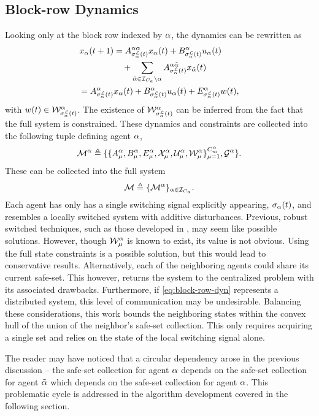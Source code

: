 \subsection{Block-row Dynamics}
Looking only at the block row indexed by $\alpha$, the dynamics can be rewritten as 
\begin{align}\label{eq:block-row-dyn}
x_\agentidx(t+1)&=A^{\agentidx\agentidx}_{\ssl[\agentidx](t)}x_\agentidx(t)+B^\agentidx_{\ssl[\agentidx](t)}u_\agentidx(t)\nonumber\\&\quad+\sum_{\tilde\agentidx\in\idxset{\numagents}\setminus \agentidx}A^{\agentidx\tilde\agentidx}_{\ssl[\agentidx](t)}x_{\tilde\agentidx}(t)\\
=A^{\agentidx}_{\ssl[\agentidx](t)}&x_\agentidx(t)+B^\agentidx_{\ssl[\agentidx](t)}u_\agentidx(t)+E_{\ssl[\agentidx](t)}^\agentidx w(t),
\end{align}
with $w(t)\in\wcon[\ssl[\agentidx](t)]^\agentidx$. The existence of $\wcon[\ssl[\agentidx](t)]^\agentidx$ can be inferred from the fact that the full system is constrained. These dynamics and constraints are collected into the following tuple defining agent $\alpha$,
$$\agent{\agentidx}\triangleq\{\{A^{\agentidx}_{\modeidx},B^\agentidx_{\modeidx}, E_{\modeidx}^\agentidx,\xcon[\modeidx]^\agentidx,\ucon[\modeidx]^\agentidx, \wcon[\modeidx]^\agentidx\}_{\modeidx=1}^{\nummodes[\agentidx]},\graph^\agentidx\}.$$
These can be collected into the full system
\begin{equation}\label{eq:agent_notation}
\mathcal{M}\triangleq\{\mathcal{M}^{\alpha}\}_{\alpha\in\mathcal{I}_{{C_a}}}.
\end{equation}
Each agent has only has a single switching signal explicitly appearing, ${\sigma}_{\alpha}(t)$, and resembles a locally switched system with additive disturbances. Previous, robust switched techniques, such as those developed in \cite{Lavaei2021}, may seem like possible solutions. However, though $\wcon[\modeidx]^\agentidx$ is known to exist, its value is not obvious. Using the full state constraints is a possible solution, but this would lead to conservative results. Alternatively, each of the neighboring agents could share its current safe-set. This however, returns the system to the centralized problem with its associated drawbacks. Furthermore, if \autoref{eq:block-row-dyn} represents a distributed system, this level of communication may be undesirable. Balancing these considerations, this work bounds the neighboring states within the convex hull of the union of the neighbor's safe-set collection. This only requires acquiring a single set and relies on the state of the local switching signal alone. 

The reader may have noticed that a circular dependency arose in the previous discussion -- the safe-set collection for agent $\alpha$ depends on the safe-set collection for agent ${\tilde{\alpha}}$ which depends on the safe-set collection for agent $\alpha$. This problematic cycle is addressed in the algorithm development covered in the following section. 